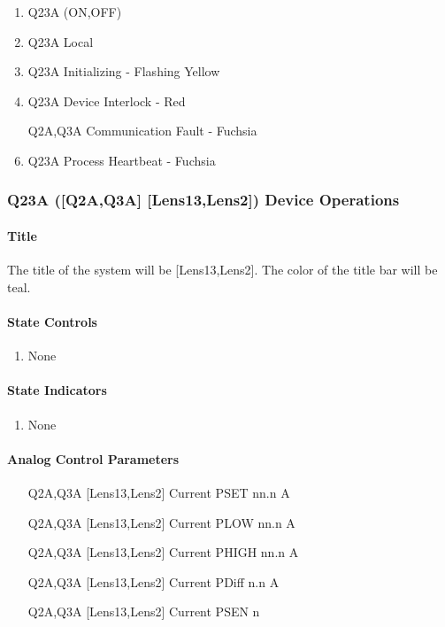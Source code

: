 \documentclass[11pt]{book}		%
\begin{document}
\begin{enumerate}
 \item Q23A (ON,OFF)
 \item Q23A Local
 \item Q23A Initializing - Flashing Yellow
 \item Q23A Device Interlock - Red
 \item [Q2A,Q3A] Communication Fault - Fuchsia
 \item Q23A Process Heartbeat - Fuchsia
\end{enumerate}

\subsubsection{Q23A ([Q2A,Q3A] [Lens13,Lens2]) Device Operations} \label{sect:cyc-op-interface-ops-terminal-device-ops-q1}

\paragraph{Title} \label{sect:cyc-op-interface-ops-terminal-device-ops-q1-title}

The title of the system will be [Lens13,Lens2].  The color of the title bar will be teal.

\paragraph{State Controls}

\begin{enumerate}
\item None
\end{enumerate}

\paragraph{State Indicators}

\begin{enumerate}
 \item None
\end{enumerate}

\paragraph{Analog Control Parameters}

\begin{enumerate}
 \item [Q2A,Q3A] [Lens13,Lens2] Current PSET   nn.n A
 \item [Q2A,Q3A] [Lens13,Lens2] Current PLOW   nn.n A
 \item [Q2A,Q3A] [Lens13,Lens2] Current PHIGH  nn.n A
 \item [Q2A,Q3A] [Lens13,Lens2] Current PDiff n.n A
 \item [Q2A,Q3A] [Lens13,Lens2] Current PSEN  n
\end{enumerate}
\end{document}
